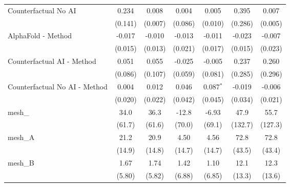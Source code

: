 \begin{tabular}{lcccccc}
   Counterfactual No AI                                        & 0.234         & 0.008         & 0.004          & 0.005          & 0.395       & 0.007\\   
                                                               & (0.141)       & (0.007)       & (0.086)        & (0.010)        & (0.286)     & (0.005)\\   
   AlphaFold - Method                                          & -0.017        & -0.010        & -0.013         & -0.011         & -0.023      & -0.007\\   
                                                               & (0.015)       & (0.013)       & (0.021)        & (0.017)        & (0.015)     & (0.023)\\   
   Counterfactual AI - Method                                  & 0.051         & 0.055         & -0.025         & -0.005         & 0.237       & 0.260\\   
                                                               & (0.086)       & (0.107)       & (0.059)        & (0.081)        & (0.285)     & (0.296)\\   
   Counterfactual No AI - Method                               & 0.004         & 0.012         & 0.046          & 0.087$^{*}$    & -0.019      & -0.006\\   
                                                               & (0.020)       & (0.022)       & (0.042)        & (0.045)        & (0.034)     & (0.021)\\   
   mesh\_                                                      & 34.0          & 36.3          & -12.8          & -6.93          & 47.9        & 55.7\\   
                                                               & (61.7)        & (61.6)        & (70.0)         & (69.1)         & (132.7)     & (127.3)\\   
   mesh\_A                                                     & 21.2          & 20.9          & 4.50           & 4.56           & 72.8        & 72.8\\   
                                                               & (14.9)        & (14.8)        & (14.7)         & (14.7)         & (43.5)      & (43.4)\\   
   mesh\_B                                                     & 1.67          & 1.74          & 1.42           & 1.10           & 12.1        & 12.3\\   
                                                               & (5.80)        & (5.82)        & (6.88)         & (6.85)         & (13.3)      & (13.6)\\   

\end{tabular}
